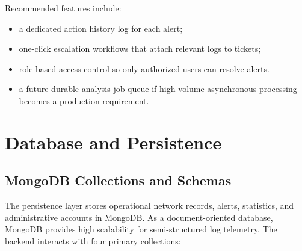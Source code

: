 \documentclass[12pt,a4paper]{report}
\begin{document}
Recommended features include:
\begin{itemize}[leftmargin=1.5em]
  \item a dedicated action history log for each alert;
  \item one-click escalation workflows that attach relevant logs to tickets;
  \item role-based access control so only authorized users can resolve alerts.
  \item a future durable analysis job queue if high-volume asynchronous processing becomes a production requirement.
\end{itemize}

\section{Database and Persistence}

\subsection{MongoDB Collections and Schemas}

The persistence layer stores operational network records, alerts, statistics, and administrative accounts in MongoDB. As a document-oriented database, MongoDB provides high scalability for semi-structured log telemetry. The backend interacts with four primary collections:
\end{document}
